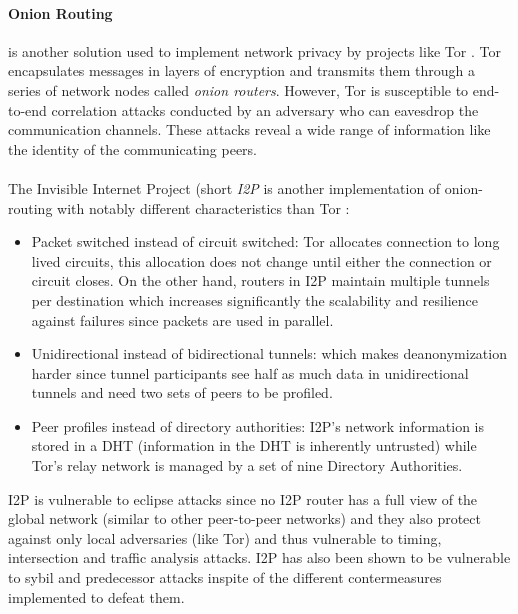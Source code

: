 \paragraph{Onion Routing} is another solution used to implement network
privacy by projects like Tor \cite{tor}. Tor encapsulates messages in layers of
encryption and transmits them through a series of network nodes called
\textit{onion routers}. However, Tor is susceptible to end-to-end correlation attacks conducted by an adversary who can eavesdrop the communication channels. These attacks reveal a wide range of information like the identity of the communicating peers.
\\~\\The Invisible Internet Project (short \textit{I2P} is another implementation
of onion-routing with notably different characteristics than Tor \cite{i2p} :

\begin{itemize}

    \item Packet switched instead of circuit switched: Tor allocates connection
        to long lived circuits, this allocation does not change until either the
        connection or circuit closes. On the other hand, routers in I2P maintain
        multiple tunnels per destination which increases significantly the
        scalability and resilience against failures since packets are used in
        parallel.

    \item Unidirectional instead of bidirectional tunnels: which makes
        deanonymization harder since tunnel participants see half as much data
        in unidirectional tunnels and need two sets of peers to be profiled.

    \item Peer profiles instead of directory authorities: I2P’s network
        information is stored in a DHT (information in the DHT is inherently
        untrusted) while Tor’s relay network is managed by a set of nine
        Directory Authorities.

\end{itemize}
I2P is vulnerable to eclipse attacks since no I2P router has a full view of the
global network (similar to other peer-to-peer networks) and they also protect
against only local adversaries (like Tor) and thus vulnerable to timing,
intersection and traffic analysis attacks. I2P has also been shown to be vulnerable
to sybil and predecessor attacks inspite of the different contermeasures
implemented to defeat them.

